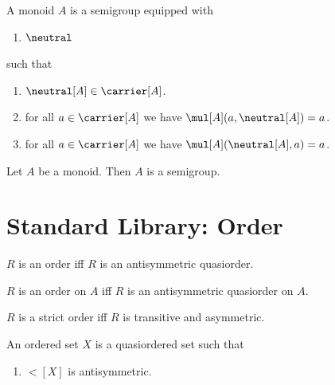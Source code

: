 \begin{struct}\label{monoid}
    A monoid $A$ is a semigroup equipped with
    \begin{enumerate}
        \item $\neutral$
    \end{enumerate}
    such that
    \begin{enumerate}
        \item\label{monoid_type} $\neutral[A]\in \carrier[A]$.
        \item\label{monoid_right} for all $a\in \carrier[A]$ we have $\mul[A](a,\neutral[A]) = a$.
        \item\label{monoid_left} for all $a\in \carrier[A]$ we have $\mul[A](\neutral[A], a) = a$.
    \end{enumerate}
\end{struct}

\begin{corollary}\label{monoid_implies_semigroup}
    Let $A$ be a monoid. Then $A$ is a semigroup.
\end{corollary}

\section{Standard Library: Order}

\begin{abbreviation}\label{order}
    $R$ is an order iff
        $R$ is an antisymmetric quasiorder.
\end{abbreviation}

\begin{abbreviation}\label{order_on}
    $R$ is an order on $A$ iff
        $R$ is an antisymmetric quasiorder on $A$.
\end{abbreviation}

\begin{abbreviation}\label{strictorder}
    $R$ is a strict order iff
        $R$ is transitive and asymmetric.
\end{abbreviation}

\begin{struct}\label{orderedset}
    An ordered set $X$ is a quasiordered set
    such that
    \begin{enumerate}
        \item\label{orderedset_antisym} $\lt[X]$ is antisymmetric.
    \end{enumerate}
\end{struct}

